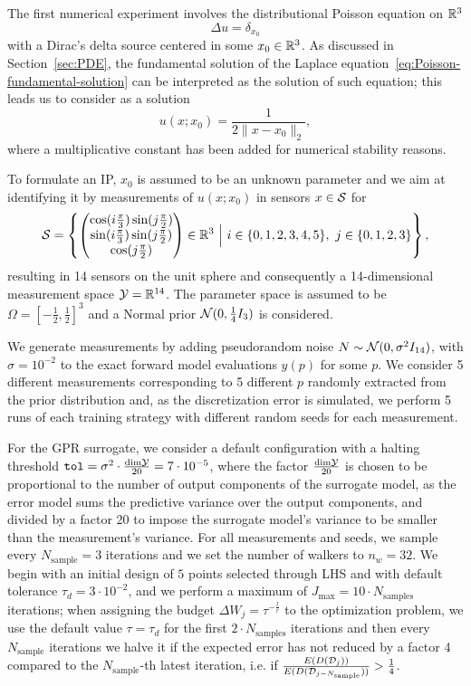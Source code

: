 The first numerical experiment involves the distributional Poisson equation on $\mathbb{R}^3$
\[
 \Delta u = \delta_{x_0}
\] 
with a Dirac's delta source centered in some $x_0 \in \mathbb{R}^3$.
As discussed in Section~\ref{sec:PDE}, the fundamental solution of the Laplace equation~\eqref{eq:Poisson-fundamental-solution} can be interpreted as the solution of such equation; this leads us to consider as a solution
\[
u(x; x_0) =  \frac{1}{2 \|x-x_0\|_2},
\]
where a multiplicative constant has been added for numerical stability reasons. \medskip

To formulate an IP, $x_0$ is assumed to be an unknown parameter and we aim at identifying it by measurements of $u(x;x_0)$ in sensors $x \in \mathcal S$ for 
\[
    \mathcal S = \left\{
        \begin{pmatrix}
            \cos( i \frac{\pi}{3}) \sin( j \frac{\pi}{2}) \\
            \sin( i \frac{\pi}{3}) \sin( j \frac{\pi}{2}) \\ 
            \cos( j \frac{\pi}{2})
        \end{pmatrix} 
        \in \mathbb{R}^3 \ \Big| \ i \in \{0,1,2,3,4,5\}, \ j \in \{0,1,2,3\}
     \right\},
\]
resulting in 14 sensors on the unit sphere and consequently a 14-dimensional measurement space $\mathcal Y = \mathbb{R}^{14}$. \newline
The parameter space is assumed to be $\Omega = \left[-\frac{1}{2}, \frac{1}{2}\right]^3$ and a Normal prior $\mathcal N (0, \frac{1}{4}I_3)$ is considered.

We generate measurements by adding pseudorandom noise $N \sim \mathcal N (0, \sigma^2 I_{14})$, with $\sigma = 10^{-2}$ to the exact forward model evaluations $y(p)$ for some $p$. 
We consider 5 different measurements corresponding to 5 different $p$ randomly extracted from the prior distribution and, as the discretization error is simulated, we perform 5 runs of each training strategy with different random seeds for each measurement.
\medskip

For the GPR surrogate, we consider a default configuration with a halting threshold $\texttt{tol} = \sigma^2 \cdot \frac{\text{dim} \mathcal Y }{20} = 7\cdot 10^{-5}$, where the factor $\frac{\text{dim} \mathcal Y}{20}$ is chosen to be proportional to the number of output components of the surrogate model, as the error model sums the predictive variance over the output components, and divided by a factor 20 to impose the surrogate model's variance to be smaller than the measurement's variance.
For all measurements and seeds, we sample every $N_{\text{sample}} = 3$ iterations and we set the number of walkers to $n_w = 32$.
We begin with an initial design of $5$ points selected through LHS and with default tolerance $\tau_d = 3 \cdot 10^{-2}$, and we perform a maximum of $J_{\max} = 10 \cdot N_{\text{samples}}$ iterations; when assigning the budget $\Delta W_j = \tau ^{-\frac{l}{r}}$ to the optimization problem, we use the default value $\tau= \tau_d$ for the first $2\cdot N_{\text{samples}}$ iterations and then every $N_{\text{sample}}$ iterations we halve it if the expected error has not reduced by a factor 4 compared to the $N_{\text{sample}}$-th latest iteration, i.e. if $\frac{E(D(\mathcal D_j))}{E(D(\mathcal D_{j-N_{\text{sample}}}))} > \frac{1}{4}$.

